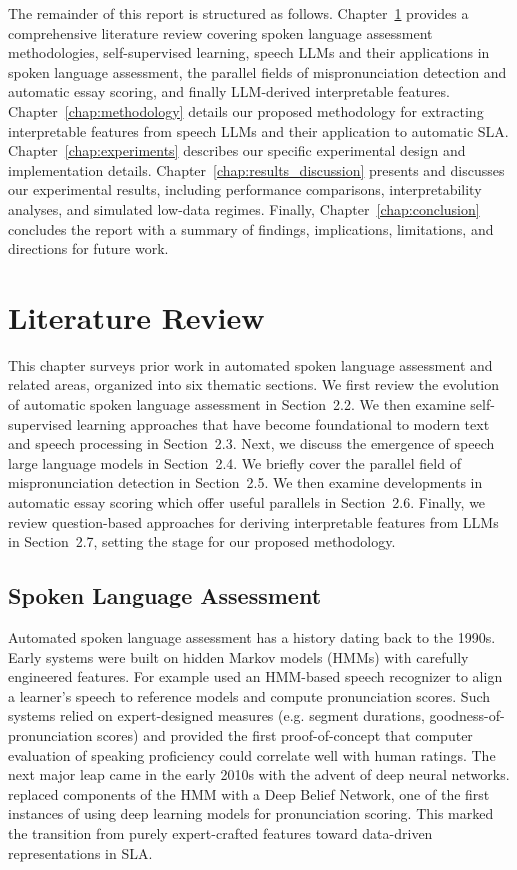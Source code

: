 \documentclass{report}
\begin{document}
The remainder of this report is structured as follows. Chapter~\ref{chap:lit_review} provides a comprehensive literature review covering spoken language assessment methodologies, self-supervised learning, speech LLMs and their applications in spoken language assessment, the parallel fields of mispronunciation detection and automatic essay scoring, and finally LLM-derived interpretable features. Chapter~\ref{chap:methodology} details our proposed methodology for extracting interpretable features from speech LLMs and their application to automatic SLA. Chapter~\ref{chap:experiments} describes our specific experimental design and implementation details. Chapter~\ref{chap:results_discussion} presents and discusses our experimental results, including performance comparisons, interpretability analyses, and simulated low-data regimes. Finally, Chapter~\ref{chap:conclusion} concludes the report with a summary of findings, implications, limitations, and directions for future work.

\chapter{Literature Review}
\label{chap:lit_review}
This chapter surveys prior work in automated spoken language assessment and related areas, organized into six thematic sections. We first review the evolution of automatic spoken language assessment in Section~2.2. We then examine self-supervised learning approaches that have become foundational to modern text and speech processing in Section~2.3. Next, we discuss the emergence of speech large language models in Section~2.4. We briefly cover the parallel field of mispronunciation detection in Section~2.5. We then examine developments in automatic essay scoring which offer useful parallels in Section~2.6. Finally, we review question-based approaches for deriving interpretable features from LLMs in Section~2.7, setting the stage for our proposed methodology.

\section{Spoken Language Assessment}
\label{sec:spoken_language_assessment}
Automated spoken language assessment has a history dating back to the 1990s. Early systems were built on hidden Markov models (HMMs) with carefully engineered features. For example \citet{bernstein90_icslp} used an HMM-based speech recognizer to align a learner’s speech to reference models and compute pronunciation scores. Such systems relied on expert-designed measures (e.g. segment durations, goodness-of-pronunciation scores) and provided the first proof-of-concept that computer evaluation of speaking proficiency could correlate well with human ratings. The next major leap came in the early 2010s with the advent of deep neural networks. \citet{qian12c_interspeech} replaced components of the HMM with a Deep Belief Network, one of the first instances of using deep learning models for pronunciation scoring. This marked the transition from purely expert-crafted features toward data-driven representations in SLA.
\end{document}
